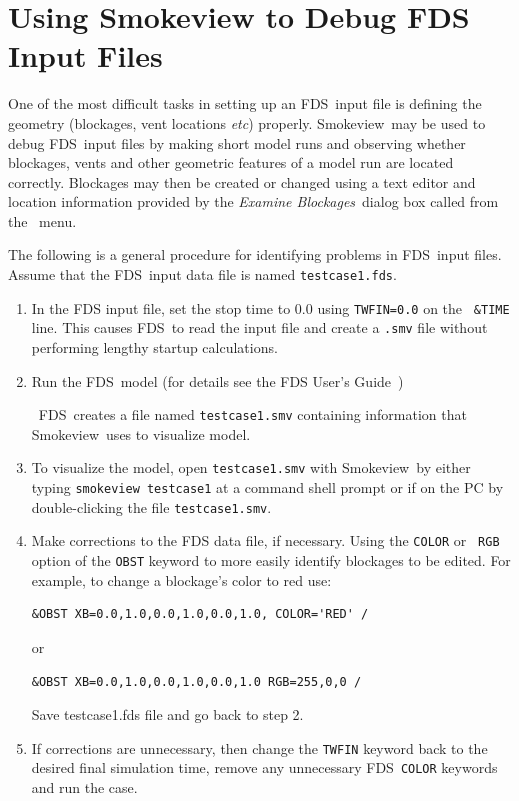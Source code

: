 \documentclass[11pt,twoside]{book}
\newcommand{\fdsinput}[1]{
{
\scriptsize

}
}
\newcommand{\FDS}{{FDS}}
\newcommand{\fds}{{FDS}}
\newcommand{\Smokeview}{{Smokeview}}
\newcommand{\smokeview}{{Smokeview}}
\newcommand{\etc}{{\em etc}}
\begin{document}
\fdsinput{sillytexture.fds}


\chapter{Using Smokeview to Debug FDS Input Files} One of the most difficult
tasks in setting up an \fds\ input file is defining the geometry
(blockages, vent locations \etc) properly. \Smokeview\ may be used
to debug \fds\ input files by making short model runs and observing
whether blockages, vents and other geometric features of a model run are
located correctly. Blockages may then be created or changed using a text editor and
location information provided by the
{\em Examine Blockages}\ dialog box called from the
\ menu.

The following is a general procedure for identifying problems in
\fds\ input files. Assume that the \fds\ input data file is named
{\tt testcase1.fds}.
\begin{enumerate}
\item In the FDS input file, set the stop time to $0.0$ using {\tt TWFIN=0.0} on the {\tt
\&TIME} line. This causes \fds\ to read the input file and create
a {\tt .smv} file without  performing lengthy startup
calculations.

\item Run the \fds\ model
(for details see the FDS User's Guide~\cite{FDS_Users_Guide_5})

\noindent\ \FDS\ creates a file named {\tt testcase1.smv}
containing information that \smokeview\ uses to visualize model.

\item To visualize the model, open {\tt testcase1.smv} with
\smokeview\ by either typing {\tt smokeview testcase1} at a
command shell prompt or if on the PC by double-clicking the file
{\tt testcase1.smv}.

\item Make corrections to the FDS data file, if necessary. Using the {\tt COLOR} or {\tt
RGB} option of the
{\tt OBST} keyword to more easily identify blockages to be edited.
For example, to change a blockage's color to red use:
\begin{verbatim}
&OBST XB=0.0,1.0,0.0,1.0,0.0,1.0, COLOR='RED' /
\end{verbatim}
\noindent or
\begin{verbatim}
&OBST XB=0.0,1.0,0.0,1.0,0.0,1.0 RGB=255,0,0 /
\end{verbatim}

\noindent Save testcase1.fds file and go back to step 2.

\item If corrections are unnecessary, then change the {\tt TWFIN}
keyword back to the desired final simulation time, remove any
unnecessary \fds\ {\tt COLOR} keywords and run the case.
\end{enumerate}
\end{document}
